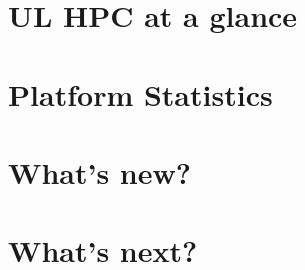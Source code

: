 \documentclass{article}
\begin{document}
\ulhpctoc

\begin{welcome}
  
\end{welcome}


\section{\faCommentAlt\ UL HPC at a glance}

\clearpage

\section{\faBarChart\ Platform Statistics}





\section{\faBullhorn\ What's new?}




\clearpage




\section{\faTime\ What's next?}


\clearpage






\end{document}
